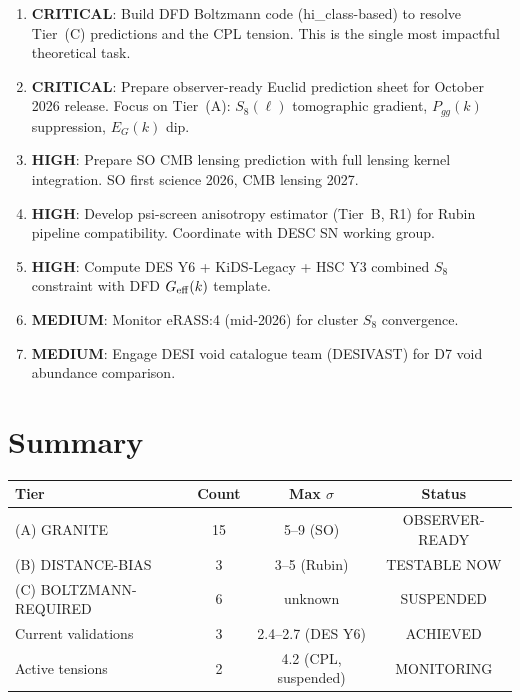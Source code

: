 \documentclass[11pt,a4paper]{article}
\newcommand{\Geff}{G_{\rm eff}}
\begin{document}
\begin{enumerate}

\item \textbf{CRITICAL}: Build DFD Boltzmann code (hi\_class-based)
  to resolve Tier~(C) predictions and the CPL tension. This is the
  single most impactful theoretical task.

\item \textbf{CRITICAL}: Prepare observer-ready Euclid prediction
  sheet for October 2026 release. Focus on Tier~(A): $S_8(\ell)$
  tomographic gradient, $P_{gg}(k)$ suppression, $E_G(k)$ dip.

\item \textbf{HIGH}: Prepare SO CMB lensing prediction with full
  lensing kernel integration. SO first science 2026, CMB lensing
  2027.

\item \textbf{HIGH}: Develop psi-screen anisotropy estimator
  (Tier~B, R1) for Rubin pipeline compatibility. Coordinate with
  DESC SN working group.

\item \textbf{HIGH}: Compute DES Y6 + KiDS-Legacy + HSC Y3
  combined $S_8$ constraint with DFD $\Geff(k)$ template.

\item \textbf{MEDIUM}: Monitor eRASS:4 (mid-2026) for cluster $S_8$
  convergence.

\item \textbf{MEDIUM}: Engage DESI void catalogue team (DESIVAST)
  for D7 void abundance comparison.

\end{enumerate}


\section{Summary}
\label{sec:summary}

\begin{center}
\begin{tabular}{lccc}
\toprule
\textbf{Tier} & \textbf{Count} & \textbf{Max $\sigma$}
& \textbf{Status} \\
\midrule
(A) GRANITE & 15 & 5--9 (SO) & OBSERVER-READY \\
(B) DISTANCE-BIAS & 3 & 3--5 (Rubin) & TESTABLE NOW \\
(C) BOLTZMANN-REQUIRED & 6 & unknown & SUSPENDED \\
\midrule
Current validations & 3 & 2.4--2.7 (DES Y6) & ACHIEVED \\
Active tensions & 2 & 4.2 (CPL, suspended) & MONITORING \\
\bottomrule
\end{tabular}
\end{center}
\end{document}
